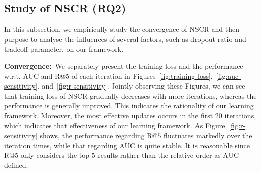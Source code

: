 \documentclass[sigconf]{acmart}
\newcommand{\wrt}{\emph{w.r.t. }}
\begin{document}
	\begin{figure*}[t]
		\centering
{}
		\vspace{-10pt}
		\caption{Training loss and recommendation performance regarding AUC and R@$5$ \wrt the number of iterations.}
		\vspace{-1em}
		\label{fig:sensitivity-analysis}
	\end{figure*}
	
	\begin{figure*}[h]
		\centering
{}
		\vspace{-10pt}
		\caption{Performance comparison of AUC and R@$5$ \wrt the dropout ratio $\rho$ and tradeoff parameter $\mu$ on Twitter-Trip and Facebook-Trip datasets.}
		\vspace{-1em}
		\label{fig:dropout-tradeoff}
	\end{figure*}
	
	\subsection{Study of NSCR (RQ2)}
	In this subsection, we empirically study the convergence of NSCR and then purpose to analyse the influences of several factors, such as dropout ratio and tradeoff parameter, on our framework.
	
	\textbf{Convergence:}~We separately present the training loss and the performance w.r.t. AUC and R@$5$ of each iteration in Figures~\ref{fig:training-loss},~\ref{fig:auc-sensitivity}, and~\ref{fig:r-sensitivity}. Jointly observing these Figures, we can see that training loss of NSCR gradually decreases with more iterations, whereas the performance is generally improved. This indicates the rationality of our learning framework. Moreover, the most effective updates occurs in the first $20$ iterations, which indicates that effectiveness of our learning framework. As Figure~\ref{fig:r-sensitivity} shows, the performance regarding R@$5$ fluctuates markedly over the iteration times, while that regarding AUC is quite stable. It is reasonable since R@$5$ only considers the top-$5$ results rather than the relative order as AUC defined.
	
\end{document}
